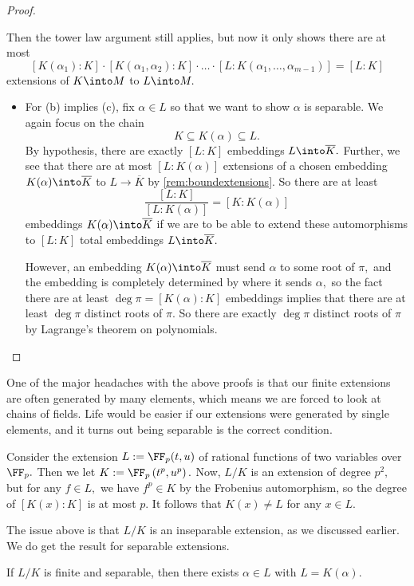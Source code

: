 \begin{proof}
\begin{remark}
		Then the tower law argument still applies, but now it only shows there are at most
		\[[K(\alpha_1):K]\cdot[K(\alpha_1,\alpha_2):K]\cdot\ldots\cdot[L:K(\alpha_1,\ldots,\alpha_{m-1})]=[L:K]\]
		extensions of $K\into M$ to $L\into M.$
	\end{remark}
	\begin{itemize}
		\item For (b) implies (c), fix $\alpha\in L$ so that we want to show $\alpha$ is separable. We again focus on the chain
		\[K\subseteq K(\alpha)\subseteq L.\]
		By hypothesis, there are exactly $[L:K]$ embeddings $L\into\overline K.$ Further, we see that there are at most $[L:K(\alpha)]$ extensions of a chosen embedding $K(\alpha)\into\overline K$ to $L\to\overline K$ by \autoref{rem:boundextensions}. So there are at least
		\[\frac{[L:K]}{[L:K(\alpha)]}=[K:K(\alpha)]\]
		embeddings $K(\alpha)\into\overline K$ if we are to be able to extend these automorphisms to $[L:K]$ total embeddings $L\into\overline K.$
		
		However, an embedding $K(\alpha)\into\overline K$ must send $\alpha$ to some root of $\pi,$ and the embedding is completely determined by where it sends $\alpha,$ so the fact there are at least $\deg\pi=[K(\alpha):K]$ embeddings implies that there are at least $\deg\pi$ distinct roots of $\pi.$ So there are exactly $\deg\pi$ distinct roots of $\pi$ by Lagrange's theorem on polynomials.
		\qedhere
	\end{itemize}
\end{proof}
One of the major headaches with the above proofs is that our finite extensions are often generated by many elements, which means we are forced to look at chains of fields. Life would be easier if our extensions were generated by single elements, and it turns out being separable is the correct condition.
\begin{nex}
	Consider the extension $L:=\FF_p(t,u)$ of rational functions of two variables over $\FF_p.$ Then we let $K:=\FF_p\left(t^p,u^p\right).$ Now, $L/K$ is an extension of degree $p^2,$ but for any $f\in L,$ we have $f^p\in K$ by the Frobenius automorphism, so the degree of $[K(x):K]$ is at most $p.$ It follows that $K(x)\ne L$ for any $x\in L.$
\end{nex}
The issue above is that $L/K$ is an inseparable extension, as we discussed earlier. We do get the result for separable extensions.
\begin{theorem}
	If $L/K$ is finite and separable, then there exists $\alpha\in L$ with $L=K(\alpha).$
\end{theorem}
